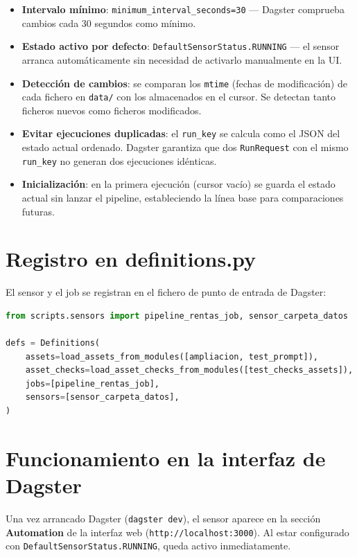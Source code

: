 \documentclass[11pt]{report}
\begin{document}
\begin{itemize}
  \item \textbf{Intervalo mínimo}: \texttt{minimum\_interval\_seconds=30} — Dagster comprueba
        cambios cada 30 segundos como mínimo.
  \item \textbf{Estado activo por defecto}: \texttt{DefaultSensorStatus.RUNNING} — el sensor
        arranca automáticamente sin necesidad de activarlo manualmente en la UI.
  \item \textbf{Detección de cambios}: se comparan los \texttt{mtime} (fechas de modificación)
        de cada fichero en \texttt{data/} con los almacenados en el cursor. Se detectan tanto
        ficheros nuevos como ficheros modificados.
  \item \textbf{Evitar ejecuciones duplicadas}: el \texttt{run\_key} se calcula como el JSON
        del estado actual ordenado. Dagster garantiza que dos \texttt{RunRequest} con el mismo
        \texttt{run\_key} no generan dos ejecuciones idénticas.
  \item \textbf{Inicialización}: en la primera ejecución (cursor vacío) se guarda el estado
        actual sin lanzar el pipeline, estableciendo la línea base para comparaciones futuras.
\end{itemize}

\section{Registro en definitions.py}

El sensor y el job se registran en el fichero de punto de entrada de Dagster:

\begin{lstlisting}[style=mystyle, language=Python, caption={Registro del sensor en definitions.py}]
from scripts.sensors import pipeline_rentas_job, sensor_carpeta_datos

defs = Definitions(
    assets=load_assets_from_modules([ampliacion, test_prompt]),
    asset_checks=load_asset_checks_from_modules([test_checks_assets]),
    jobs=[pipeline_rentas_job],
    sensors=[sensor_carpeta_datos],
)
\end{lstlisting}

\section{Funcionamiento en la interfaz de Dagster}

Una vez arrancado Dagster (\texttt{dagster dev}), el sensor aparece en la sección
\textbf{Automation} de la interfaz web (\texttt{http://localhost:3000}). Al estar configurado
con \texttt{DefaultSensorStatus.RUNNING}, queda activo inmediatamente.
\end{document}

